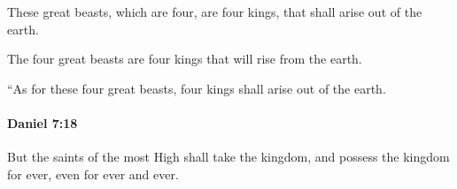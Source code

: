 			\begin{versebox}
					\item[BHS] 
					\item[LXX] 
					\item[ASV] These great beasts, which are four, are four kings, that shall arise out of the earth.
					\item[NIV] The four great beasts are four kings that will rise from the earth.
					\item[NRSV] “As for these four great beasts, four kings shall arise out of the earth.
			\end{versebox}

		\paragraph{Daniel 7:18} %
			\label{DANIEL-7-18}

			But the saints of the most High shall take the kingdom, and possess the kingdom for ever, even for ever and ever.

